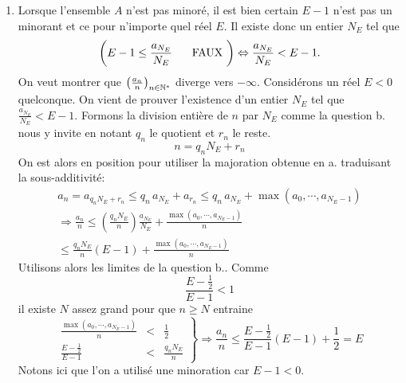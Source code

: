 \begin{enumerate}
\begin{enumerate}
 \item Lorsque l'ensemble $A$ n'est pas minoré, il est bien certain $E-1$ n'est pas un minorant et ce pour n'importe quel réel $E$. Il existe donc un entier $N_E$ tel que 
\begin{displaymath}
  \left( E-1\leq \frac{a_{N_E}}{N_E} \hspace{0.5cm}\text{ FAUX }\right) \Leftrightarrow \frac{a_{N_E}}{N_E} < E-1.
\end{displaymath}
On veut montrer que $\left( \frac{a_n}{n}\right) _{n\in \mathbb{N}^*}$ diverge vers $-\infty$. Considérons un réel $E < 0$ quelconque.\newline
On vient de prouver l'existence d'un entier $N_E$ tel que $\frac{a_{N_E}}{N_E}<E-1$. Formons la division entière de $n$ par $N_E$ comme la question b. nous y invite en notant $q_n$ le quotient et $r_n$ le reste.
\begin{displaymath}
  n = q_nN_E + r_n
\end{displaymath}
On est alors en position pour utiliser la majoration obtenue en a. traduisant la sous-additivité:
\begin{multline*}
 a_n = a_{q_nN_E + r_n} 
\leq q_n\,a_{N_E} + a_{r_n}
\leq q_n\,a_{N_E} + \max(a_0,\cdots,a_{N_E-1})\\
\Rightarrow
\frac{a_n}{n}\leq (\frac{q_nN_E}{n}) \frac{a_{N_E}}{N_E} + \frac{\max(a_0,\cdots,a_{N_E-1})}{n}\\
\leq \frac{q_nN_E}{n}(E-1) + \frac{\max(a_0,\cdots,a_{N_E-1})}{n}
\end{multline*}
Utilisons alors les limites de la question b.. Comme
\begin{displaymath}
  \frac{E-\frac{1}{2}}{E - 1} < 1
\end{displaymath}
il existe $N$ assez grand pour que $n\geq N$ entraine
\begin{displaymath}
\left.  
\begin{aligned}
\frac{\max(a_0,\cdots,a_{N_E-1})}{n} &<& \frac{1}{2} \\
\frac{E-\frac{1}{2}}{E - 1} &<& \frac{q_nN_E}{n}  
\end{aligned}
\right\rbrace 
\Rightarrow
\frac{a_n}{n} \leq 
\frac{E-\frac{1}{2}}{E - 1} (E-1) + \frac{1}{2} = E
\end{displaymath}
Notons ici que l'on a utilisé une minoration car $E-1 < 0$.


\end{enumerate}
\end{enumerate}
